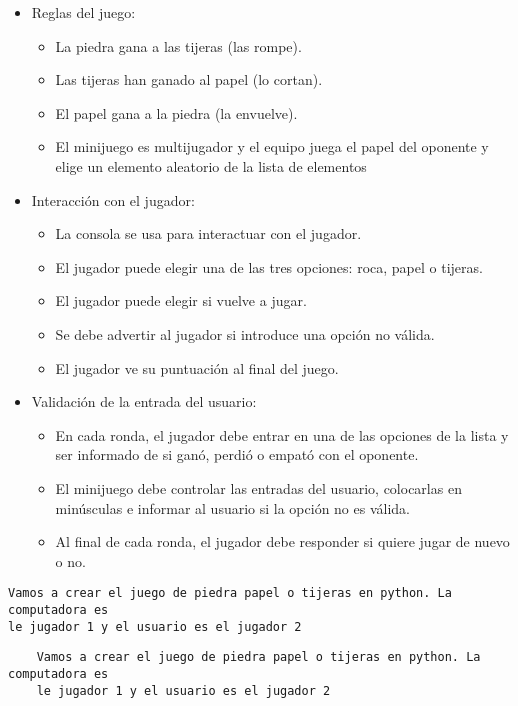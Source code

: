 \begin{itemize}
    \item Reglas del juego:
    \begin{itemize}
        \item La piedra gana a las tijeras (las rompe).
        \item Las tijeras han ganado al papel (lo cortan).
        \item El papel gana a la piedra (la envuelve).
        \item El minijuego es multijugador y el equipo juega el papel del oponente 
                y elige un elemento aleatorio de la lista de elementos
    \end{itemize}
    \item Interacción con el jugador:
    \begin{itemize}
        \item La consola se usa para interactuar con el jugador.
        \item El jugador puede elegir una de las tres opciones: roca, papel o tijeras.
        \item El jugador puede elegir si vuelve a jugar.
        \item Se debe advertir al jugador si introduce una opción no válida.
        \item El jugador ve su puntuación al final del juego.
    \end{itemize}
    \item Validación de la entrada del usuario:
     \begin{itemize}
        \item En cada ronda, el jugador debe entrar en una de las opciones de la lista 
                y ser informado de si ganó, perdió o empató con el oponente.
        \item El minijuego debe controlar las entradas del usuario, colocarlas en 
                minúsculas e informar al usuario si la opción no es válida.
        \item Al final de cada ronda, el jugador debe responder si quiere jugar de nuevo o no.
     \end{itemize}
\end{itemize}

\begin{verbatim}
Vamos a crear el juego de piedra papel o tijeras en python. La computadora es 
le jugador 1 y el usuario es el jugador 2
\end{verbatim}

\begin{verbatim}
    Vamos a crear el juego de piedra papel o tijeras en python. La computadora es 
    le jugador 1 y el usuario es el jugador 2
\end{verbatim}
